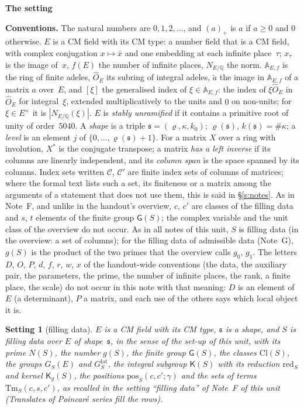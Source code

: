 \documentclass[11pt,a4paper]{article}
\newcommand{\Q}{\mathbb{Q}}
\newcommand{\m}[1]{\mbox{$#1$}}        %
\newcommand{\sect}[2]{\refstepcounter{section}\label{#2}\par\addvspace{19pt plus 4pt minus 2pt}\Needspace{7\baselineskip}%
  \noindent\llap{{\fontsize{13.2}{16}\selectfont\bfseries\color{inkfaint}\thesection}\hspace{9pt}}%
  {\fontsize{13.2}{16}\selectfont\bfseries\color{ink}#1}\par\nopagebreak\vspace{-1pt}}
\theoremstyle{plainx}
\theoremstyle{uprightx}
\newtheorem{setting}[theorem]{Setting}          %
\newenvironment{conventions}{\par\addvspace{5pt}\noindent\textbf{Conventions.}\enspace\ignorespaces}{\par\addvspace{3pt}}
\newcommand{\fs}{\mathfrak{s}}                      %
\newcommand{\AEf}{\mathbb{A}_{E,f}}
\newcommand{\hO}{\hat{O}_E}
\newcommand{\rh}[1]{\varrho(#1)}                    %
\newcommand{\kk}[1]{k(#1)}                          %
\newcommand{\ninf}[1]{f(#1)}                        %
\newcommand{\NS}[1]{N(#1)}                          %
\newcommand{\gS}[1]{g(#1)}                          %
\newcommand{\GS}[2]{G_{#1}(#2)}                     %
\newcommand{\GFin}[1]{G^{\mathrm{lat}}_{#1}}        %
\newcommand{\GRes}[1]{\mathsf{G}(#1)}               %
\newcommand{\Cl}[1]{\mathrm{Cl}(#1)}                %
\newcommand{\KS}[1]{\mathsf{K}(#1)}                          %
\newcommand{\redS}[1]{\mathrm{red}_{#1}}            %
\newcommand{\KgS}[1]{\mathsf{K}_g(#1)}                       %
\newcommand{\pos}[4]{\mathrm{pos}_{#1}(#2,#3;#4)}   %
\newcommand{\terms}[4]{\mathrm{Tm}_{#1}(#2,#3,#4)}  %
\begin{document}
\sect{The setting}{s:setting}
\begin{conventions}\label{c:conventions}
The natural numbers are \m{0,1,2,\dots}, and \m{(a)_+} is $a$ if \m{a\ge0} and $0$ otherwise. $E$ is a CM field
with its CM type: a number field that is a CM field, with complex conjugation \m{x\mapsto\bar x} and one
embedding at each infinite place~$\tau$; \m{x_\tau} is the image of~$x$, \m{\ninf{E}} the number of infinite
places, \m{N_{E/\Q}} the norm. \m{\AEf} is the ring of finite adeles, \m{\hO} its subring of integral adeles,
\m{\tilde a} the image in \m{\AEf} of a matrix $a$ over~$E$, and \m{[\xi]} the generalised index of
\m{\xi\in\AEf}: the index of \m{\xi\hO} in \m{\hO} for integral~$\xi$, extended multiplicatively to the units
and $0$ on non-units; for \m{\xi\in E^\times} it is \m{|N_{E/\Q}(\xi)|}. $E$ is \emph{stably unramified} if
it contains a primitive root of unity of order~$5040$. A \emph{shape} is a triple
\m{\fs=(\varrho,\kappa,k_0)}; \m{\rh{\fs}}, \m{\kk{\fs}=\#\kappa}; a \emph{level} is an element $j$ of
\m{\{0,\dots,\rh{\fs}+1\}}. For a matrix $X$ over a ring with involution, $X^*$ is the conjugate transpose; a
matrix \emph{has a left inverse} if its columns are linearly independent, and its \emph{column span} is the
space spanned by its columns. Index sets written $\mathcal C$, $\mathcal C'$ are finite index sets of columns
of matrices; where the formal text lists such a set, its finiteness or a matrix among the arguments of a
statement that does not use them, this is said in §\ref{s:notes}. As in Note~F, and unlike in the handout's
overview, $c$, $c'$ are classes of the filling data and $s$, $t$ elements of the finite group \m{\GRes{S}}; the
complex variable and the unit class of the overview do not occur. As in all notes of this unit, $S$ is filling
data (in the overview: a set of columns); for the filling data of admissible data (Note~G), \m{\gS{S}} is the
product of the two primes that the overview calls $g_0$, $g_1$. The letters $D$, $O$, $P$, $d$, $f$, $r$, $w$, $x$ of the
handout-wide conventions (the data, the auxiliary pair, the parameters, the prime, the number of infinite places, the
rank, a finite place, the scale) do not occur in this note with that meaning: $D$ is an element of $E$ (a determinant),
$P$ a matrix, and each use of the others says which local object it is.
\end{conventions}

\begin{setting}[filling data]\label{s:S}
$E$ is a CM field with its CM type, $\fs$ is a shape, and $S$ is filling data over $E$ of shape~$\fs$, in the
sense of the set-up of this unit, with its prime \m{\NS{S}}, the number \m{\gS{S}}, the finite group
\m{\GRes{S}}, the classes \m{\Cl{S}}, the groups \m{\GS{S}{E}} and \m{\GFin{S}}, the integral subgroup \m{\KS{S}}
with its reduction \m{\redS{S}} and kernel \m{\KgS{S}}, the positions \m{\pos{S}{c}{c'}{\gamma}} and the sets of
terms \m{\terms{S}{c}{s}{c'}}, as recalled in the setting ``filling data'' of Note~F of this unit (\emph{Translates
of Poincaré series fill the rows}).
\end{setting}
\end{document}
